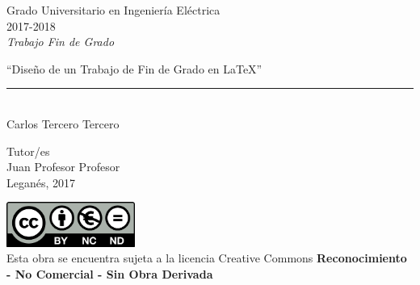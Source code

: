 \documentclass[12pt]{report} %
\begin{document}
	
\begin{titlepage}
	\begin{sffamily}
	\color{azulUC3M}
	\begin{center}
		\begin{figure}[H] %
		\end{figure}
		\vspace{2.5cm}
		\begin{Large}
			Grado Universitario en Ingeniería Eléctrica\\			
			2017-2018\\
			\vspace{2cm}		
			\textsl{Trabajo Fin de Grado}
			\bigskip
			
		\end{Large}
		 	{\Huge ``Diseño de un Trabajo de Fin de Grado en \LaTeX''}\\
		 	\vspace*{0.5cm}
	 		\rule{10.5cm}{0.1mm}\\
			\vspace*{0.9cm}
			{\LARGE Carlos Tercero Tercero}\\ 
			\vspace*{1cm}
		\begin{Large}
			Tutor/es\\
			Juan Profesor Profesor\\
			Leganés, 2017\\
		\end{Large}
	\end{center}
	\vfill
	\color{black}
	\includegraphics[width=4.2cm]{imagenes/creativecommons.png}\\
	Esta obra se encuentra sujeta a la licencia Creative Commons \textbf{Reconocimiento - No Comercial - Sin Obra Derivada}
	\end{sffamily}
\end{titlepage}
\end{document}
